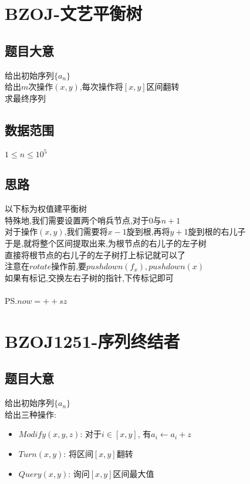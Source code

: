 \documentclass{ctexart}
\numberwithin{equation}{section}
\begin{document}
\begin{flushleft}
  \section{BZOJ-文艺平衡树}
  \subsection{题目大意}
  给出初始序列$\{a_n\}$\\
  给出$m$次操作$(x,y)$,每次操作将$[x,y]$区间翻转\\
  求最终序列\\
  \subsection{数据范围}
  $1\le n\le 10^5$\\
  \subsection{思路}
  以下标为权值建平衡树\\
  特殊地,我们需要设置两个哨兵节点,对于$0$与$n+1$\\
  对于操作$(x,y)$,我们需要将$x-1$旋到根,再将$y+1$旋到根的右儿子\\
  于是,就将整个区间提取出来,为根节点的右儿子的左子树\\
  直接将根节点的右儿子的左子树打上标记就可以了\\
  注意在$rotate$操作前,要$pushdown(f_x),pushdown(x)$\\
  如果有标记,交换左右子树的指针,下传标记即可\\

  ~\\
  PS.$now = ++sz$\\
  \newpage

  \section{BZOJ1251-序列终结者}
  \subsection{题目大意}
  给出初始序列$\{a_n\}$\\
  给出三种操作:\\
  \begin{itemize}
  \item $Modify(x,y,z)$: 对于$i\in [x,y]$, 有$a_i\leftarrow a_i+z$
  \item $Turn(x,y)$: 将区间$[x,y]$翻转
  \item $Query(x,y)$: 询问$[x,y]$区间最大值
  \end{itemize}

\end{flushleft}
\end{document}
